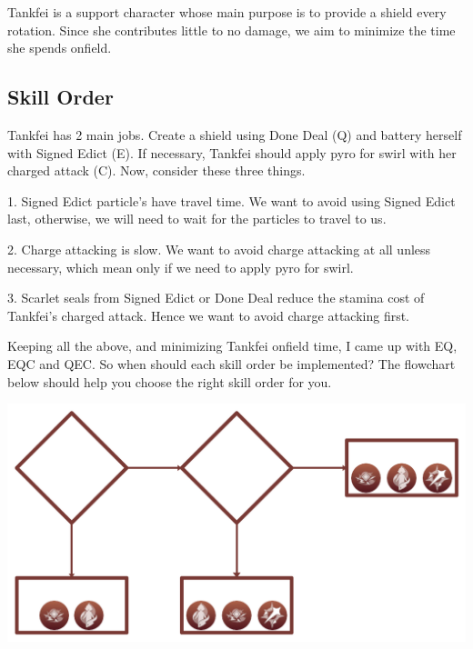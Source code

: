 \documentclass[11pt]{article}
\begin{document}
Tankfei is a support character whose main purpose is to provide a shield every rotation. Since she contributes little to no damage, we aim to minimize the time she spends onfield. 

\subsection{Skill Order}

Tankfei has 2 main jobs. Create a shield using Done Deal (Q) and battery herself with Signed Edict (E). If necessary, Tankfei should apply pyro for swirl with her charged attack (C). Now, consider these three things.

1. Signed Edict particle's have travel time. We want to avoid using Signed Edict last, otherwise, we will need to wait for the particles to travel to us. 

2. Charge attacking is slow. We want to avoid charge attacking at all unless necessary, which mean only if we need to apply pyro for swirl. 

3. Scarlet seals from Signed Edict or Done Deal reduce the stamina cost of Tankfei's charged attack. Hence we want to avoid charge attacking first. 

Keeping all the above, and minimizing Tankfei onfield time, I came up with EQ, EQC and QEC. So when should each skill order be implemented? The flowchart below should help you choose the right skill order for you. 

\begin{center}
\includegraphics[scale = 0.2325]{Flowchart.png}
\end{center}

\end{document}
